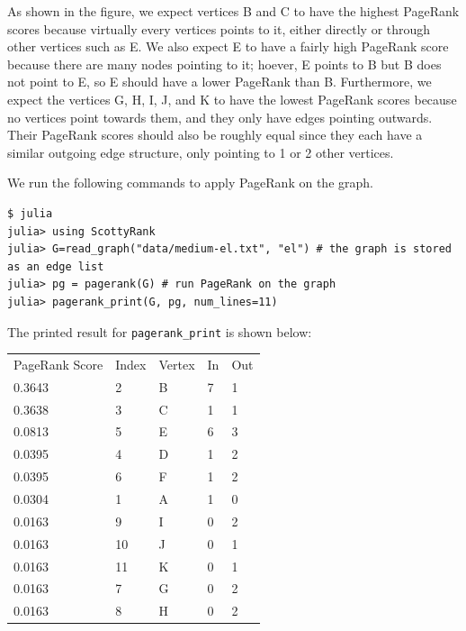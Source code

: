 \documentclass[12pt, titlepage, twoside]{amsart}
\begin{document}
As shown in the figure, we expect vertices B and C to have the highest PageRank scores
because virtually every vertices points to it, either directly or through other vertices such as E.
We also expect E to have a fairly high PageRank score because there are many nodes pointing to it;
hoever, E points to B but B does not point to E, so E should have a lower PageRank than B.
Furthermore, we expect the vertices G, H, I, J, and K to have the lowest PageRank scores because
no vertices point towards them, and they only have edges pointing outwards.
Their PageRank scores should also be roughly equal since they each have a similar outgoing edge structure,
only pointing to 1 or 2 other vertices.

We run the following commands to apply PageRank on the graph.

\begin{verbatim}
$ julia
julia> using ScottyRank
julia> G=read_graph("data/medium-el.txt", "el") # the graph is stored as an edge list
julia> pg = pagerank(G) # run PageRank on the graph
julia> pagerank_print(G, pg, num_lines=11)
\end{verbatim}

The printed result for \texttt{pagerank_print} is shown below:

\begin{table}[h]
\begin{tabular}{lllll}
PageRank Score & Index & Vertex & In & Out\\
    0.3643 &        2 &         B& 7 &         1 \\
    0.3638 &         3 &         C& 1 &         1 \\
    0.0813 &         5 &         E& 6 &         3 \\
    0.0395 &         4 &         D& 1 &         2 \\
    0.0395 &         6 &         F& 1 &         2 \\
    0.0304 &         1 &         A& 1 &         0 \\
    0.0163 &         9 &         I& 0 &         2 \\
    0.0163 &        10 &         J& 0 &         1 \\
    0.0163 &        11 &         K& 0 &         1 \\
    0.0163 &         7 &         G& 0 &         2 \\
    0.0163 &         8 &         H& 0 &          2\\
\end{tabular}
\end{table}
\end{document}
